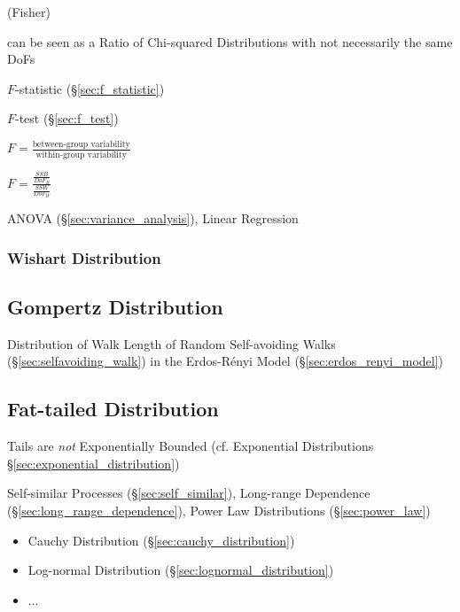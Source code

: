 (Fisher)

can be seen as a Ratio of Chi-squared Distributions with not necessarily the
same DoFs

$F$-statistic (\S\ref{sec:f_statistic})

$F$-test (\S\ref{sec:f_test})

$F = \frac{\text{between-group variability}}{\text{within-group variability}}$

$F = \frac{\frac{SSB}{DoF_B}}{\frac{SSW}{DoF_W}}$

ANOVA (\S\ref{sec:variance_analysis}), Linear Regression



\subsubsection{Wishart Distribution}\label{sec:wishart_distribution}



\subsection{Gompertz Distribution}\label{sec:gompertz_distribution}

Distribution of Walk Length of Random Self-avoiding Walks
(\S\ref{sec:selfavoiding_walk}) in the Erdos-R\'enyi Model
(\S\ref{sec:erdos_renyi_model})



\subsection{Fat-tailed Distribution}\label{sec:fat_tailed}

Tails are \emph{not} Exponentially Bounded (cf. Exponential Distributions
\S\ref{sec:exponential_distribution})

\fist Self-similar Processes (\S\ref{sec:self_similar}), Long-range Dependence
(\S\ref{sec:long_range_dependence}), Power Law Distributions
(\S\ref{sec:power_law})

\begin{itemize}
  \item Cauchy Distribution (\S\ref{sec:cauchy_distribution})
  \item Log-normal Distribution (\S\ref{sec:lognormal_distribution})
  \item ...
\end{itemize}

